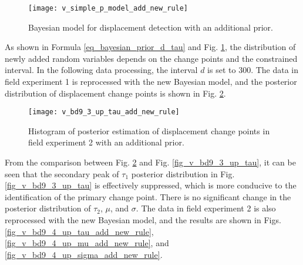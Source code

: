 \documentclass{svjour3}                     %
\begin{document}
\begin{figure}[H]
	\centering
	\texttt{[image: v\_simple\_p\_model\_add\_new\_rule]}
	\caption{Bayesian model for displacement detection with an additional prior.}
	\label{fig_v_simple_p_model_add_new_rule}
\end{figure} 
As shown in Formula \ref{eq_bayesian_prior_d_tau} and Fig. \ref{fig_v_simple_p_model_add_new_rule}, the distribution of newly added random variables depends on the change points and the constrained interval. 
In the following data processing, the interval $d$ is set to 300.
The data in field experiment 1 is reprocessed with the new Bayesian model, and the posterior distribution of displacement change points is shown in Fig. \ref{fig_v_bd9_3_up_tau_add_new_rule}.

\begin{figure}[htbp]
	\centering
	\texttt{[image: v\_bd9\_3\_up\_tau\_add\_new\_rule]}
	\caption{Histogram of posterior estimation of displacement change points in field experiment 2 with an additional prior.}
	\label{fig_v_bd9_3_up_tau_add_new_rule}
\end{figure} 

From the comparison between Fig. \ref{fig_v_bd9_3_up_tau_add_new_rule} and Fig. \ref{fig_v_bd9_3_up_tau}, it can be seen that the secondary peak of $\tau_1$ posterior distribution in Fig. \ref{fig_v_bd9_3_up_tau} is effectively suppressed, which is more conducive to the identification of the primary change point. There is no significant change in the posterior distribution of $\tau_2$, $\mu$, and  $\sigma$.
The data in field experiment 2 is also reprocessed with the new Bayesian model, and the results are shown in Figs. \ref{fig_v_bd9_4_up_tau_add_new_rule}, \ref{fig_v_bd9_4_up_mu_add_new_rule}, and \ref{fig_v_bd9_4_up_sigma_add_new_rule}.
\end{document}
